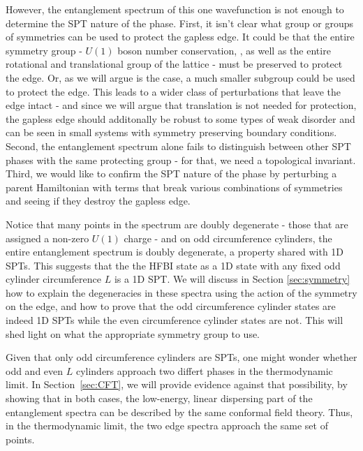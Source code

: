 However, the entanglement spectrum of this one wavefunction is not enough to
determine the SPT nature of the phase. First, it isn't clear what group or
groups of symmetries can be used to protect the gapless edge. It could be that
the entire symmetry group - $U(1)$ boson number conservation, , as well as the entire rotational and translational group
of the lattice - must be preserved to protect the edge. Or, as we will argue
is the case, a much smaller subgroup could be used to protect the edge. This
leads to a wider class of perturbations that leave the edge intact - and since
we will argue that translation is not needed for protection, the gapless edge should additonally be robust to some types of weak disorder and can be seen in
small systems with symmetry preserving boundary conditions. Second, the
entanglement spectrum alone fails to distinguish between other SPT phases with
the same protecting group - for that, we need a topological invariant. Third,
we would like to confirm the SPT nature of the phase by perturbing a parent
Hamiltonian with terms that break various combinations of symmetries and
seeing if they destroy the gapless edge.


Notice that many points in the spectrum are doubly degenerate - those that are
assigned a non-zero $U(1)$ charge - and on odd circumference cylinders, the
entire entanglement spectrum is doubly degenerate, a property shared with 1D SPTs. This suggests that the the HFBI state as a 1D state with any
fixed odd cylinder circumference $L$ is a 1D SPT. We will discuss in
Section \ref{sec:symmetry} how to explain the degeneracies in these spectra
using the action of the symmetry on the edge, and how to prove that the odd
circumference cylinder states are indeed 1D SPTs while the even circumference
cylinder states are not. This will shed light on what the appropriate symmetry
group to use.

Given that only odd circumference cylinders are SPTs, one might wonder whether
odd and even $L$ cylinders approach two differt phases in the thermodynamic
limit. In Section~\ref{sec:CFT}, we will provide evidence against that
possibility, by showing that in both cases, the low-energy, linear dispersing
part of the entanglement spectra can be described by the same conformal field
theory. Thus, in the thermodynamic limit, the two edge spectra approach the
same set of points.

